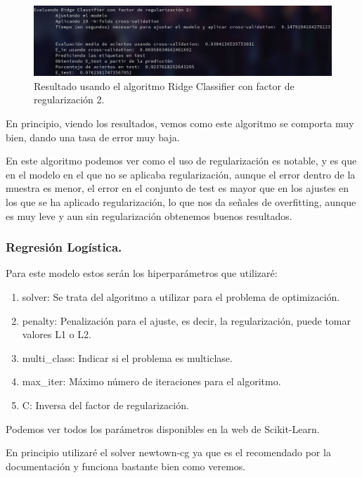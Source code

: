 \documentclass[12pt, spanish]{article}
\begin{document}
\begin{figure}[H]
	\centering
	\includegraphics[scale=0.45]{clasificacion/ridge2.png}
	\caption{Resultado usando el algoritmo Ridge Classifier con factor de regularización 2.}
	\label{ridge2}
\end{figure}


En principio, viendo los resultados, vemos como este algoritmo se comporta muy bien, dando una tasa de error muy baja.

En este algoritmo podemos ver como el uso de regularización es notable, y es que en el modelo en el que no se aplicaba regularización, aunque el error dentro de la muestra es menor, el error en el conjunto de test es mayor que en los ajustes en los que se ha aplicado regularización, lo que nos da señales de overfitting, aunque es muy leve y aun sin regularización obtenemos buenos resultados.


\newpage

\subsubsection{Regresión Logística.}

Para este modelo estos serán los hiperparámetros que utilizaré:

\begin{enumerate}
	\item solver: Se trata del algoritmo a utilizar para el problema de optimización.
	\item penalty: Penalización para el ajuste, es decir, la regularización, puede tomar valores L1 o L2. 
	\item multi\_class: Indicar si el problema es multiclase.
	\item max\_iter: Máximo número de iteraciones para el algoritmo.
	\item C: Inversa del factor de regularización.
\end{enumerate}

Podemos ver todos los parámetros disponibles en la web de Scikit-Learn\cite{logisticregression}.


En principio utilizaré el solver newtown-cg ya que es el recomendado por la documentación y funciona bastante bien como veremos.
\end{document}
